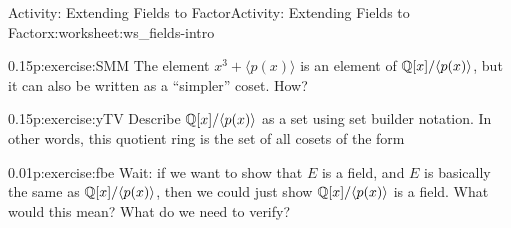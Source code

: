 \documentclass[11pt]{book}
\begin{document}
\begin{worksheet-subsection}{Activity: Extending Fields to Factor}{}{Activity: Extending Fields to Factor}{}{}{x:worksheet:ws_fields-intro}
\begin{divisionexercise}{7}{}{0.15}{p:exercise:SMM}
The element \(x^3+\langle p(x) \rangle\) is an element of \(\mathbb{Q}[x]/\langle p(x) \rangle\), but it can also be written as a ``simpler'' coset.  How?%
\end{divisionexercise}%
\begin{divisionexercise}{8}{}{0.15}{p:exercise:yTV}%
Describe \(\mathbb{Q}[x]/\langle p(x) \rangle\) as a set using set builder notation.  In other words, this quotient ring is the set of all cosets of the form \textellipsis{}%
\end{divisionexercise}%
\begin{divisionexercise}{9}{}{0.01}{p:exercise:fbe}%
Wait: if we want to show that \(E\) is a field, and \(E\) is basically the same as \(\mathbb{Q}[x]/\langle p(x) \rangle\), then we could just show \(\mathbb{Q}[x]/\langle p(x) \rangle\) is a field.  What would this mean?  What do we need to verify?%
\end{divisionexercise}%
\end{worksheet-subsection}
\restoregeometry
\end{document}
